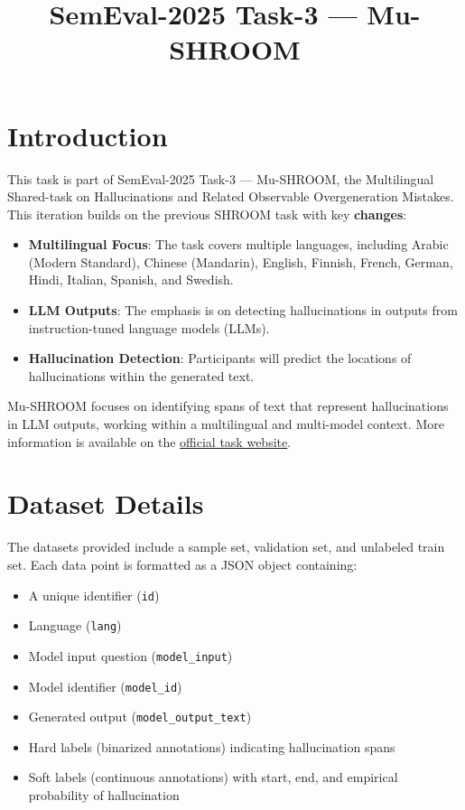 \documentclass{article}
\title{SemEval-2025 Task-3 — Mu-SHROOM}
\author{}
\date{}
\begin{document}
\maketitle

\section{Introduction}

This task is part of SemEval-2025 Task-3 — Mu-SHROOM, the Multilingual Shared-task on Hallucinations and Related Observable Overgeneration Mistakes. This iteration builds on the previous SHROOM task with key \textbf{changes}:

\begin{itemize}
    \item \textbf{Multilingual Focus}: The task covers multiple languages, including Arabic (Modern Standard), Chinese (Mandarin), English, Finnish, French, German, Hindi, Italian, Spanish, and Swedish.
    \item \textbf{LLM Outputs}: The emphasis is on detecting hallucinations in outputs from instruction-tuned language models (LLMs).
    \item \textbf{Hallucination Detection}: Participants will predict the locations of hallucinations within the generated text.
\end{itemize}

Mu-SHROOM focuses on identifying spans of text that represent hallucinations in LLM outputs, working within a multilingual and multi-model context. More information is available on the \href{https://helsinki-nlp.github.io/shroom/}{official task website}.

\section{Dataset Details}

The datasets provided include a sample set, validation set, and unlabeled train set. Each data point is formatted as a JSON object containing:

\begin{itemize}
    \item A unique identifier (\texttt{id})
    \item Language (\texttt{lang})
    \item Model input question (\texttt{model\_input})
    \item Model identifier (\texttt{model\_id})
    \item Generated output (\texttt{model\_output\_text})
    \item Hard labels (binarized annotations) indicating hallucination spans
    \item Soft labels (continuous annotations) with start, end, and empirical probability of hallucination
\end{itemize}
\end{document}
